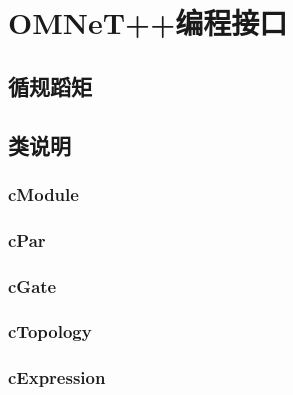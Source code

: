 \chapter{OMNeT++编程接口}

\begin{summary}
  \blindtext
\end{summary}

\section{循规蹈矩}
\Blindtext

\section{类说明}
\Blindtext


\subsection{cModule}
\Blindtext

\subsection{cPar}
\Blindtext

\subsection{cGate}
\Blindtext

\subsection{cTopology}
\Blindtext

\subsection{cExpression}
\Blindtext


